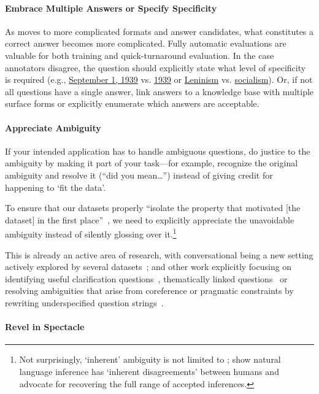 \paragraph{Embrace Multiple Answers or Specify Specificity}

As \qa{} moves to more complicated formats and answer candidates, what constitutes a correct answer becomes more complicated.
Fully automatic evaluations are valuable for both training and quick-turnaround evaluation.
In the case annotators disagree, the question should explicitly state what level of specificity is required (e.g., \underline{September 1, 1939} vs. \underline{1939} or \underline{Leninism} vs. \underline{socialism}).
Or, if not all questions have a single answer, link answers to a knowledge base with multiple surface forms or explicitly enumerate which answers are acceptable.

\paragraph{Appreciate Ambiguity}

If your intended  application has to handle ambiguous questions,
do justice to the ambiguity by making it part of your task---for example, recognize the
original ambiguity and resolve it (``did you mean\dots'') instead of giving credit
for happening to `fit the data'.

To ensure that our datasets properly ``isolate the property that
motivated [the dataset] in the first place''~\cite{Zaenen-2006}, we
need to explicitly appreciate the unavoidable ambiguity instead of
silently glossing over it.\footnote{Not surprisingly, `inherent'
  ambiguity is not limited to ; \citet{pavlick-19} show
  natural language inference has `inherent disagreements'
  between humans and advocate for recovering the full range of
  accepted inferences.}

This is already an active area of research, with conversational  being a new setting
actively explored by several datasets~\cite{reddy-18,choi-18}; and other work explicitly focusing on
identifying useful clarification questions~\cite{rao-2018}, thematically linked questions~\cite{elgohary-18} or resolving ambiguities that arise from
coreference or pragmatic constraints by rewriting underspecified question strings~\cite{elgohary-19,min-20}.

\paragraph{Revel in Spectacle}


